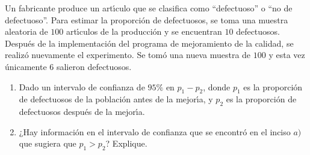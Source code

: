 \begin{enunciado}
 Un fabricante produce un art\'{\i}culo que se clasifica como ``defectuoso'' o ``no de defectuoso''. Para estimar la proporci\'on de defectuosos, se toma una muestra aleatoria de $100$ art\'{\i}culos de la producci\'on y se encuentran $10$ defectuosos. Despu\'es de la implementaci\'on del programa de mejoramiento de la calidad, se realiz\'o nuevamente el experimento. Se tom\'o una nueva muestra de $100$ y esta vez \'unicamente $6$ salieron defectuosos.
 \begin{enumerate}
  \item Dado un intervalo de confianza de $95\%$ en $p_1 - p_2$, donde $p_1$ es la proporci\'on de defectuosos de la poblaci\'on antes de la mejor\'{\i}a, y $p_2$ es la proporci\'on de defectuosos despu\'es de la mejor\'{\i}a.
  
  \item ¿Hay informaci\'on en el intervalo de confianza que se encontr\'o en el inciso $a)$ que sugiera que $p_1 > p_2$? Explique.
 \end{enumerate}
\end{enunciado}

